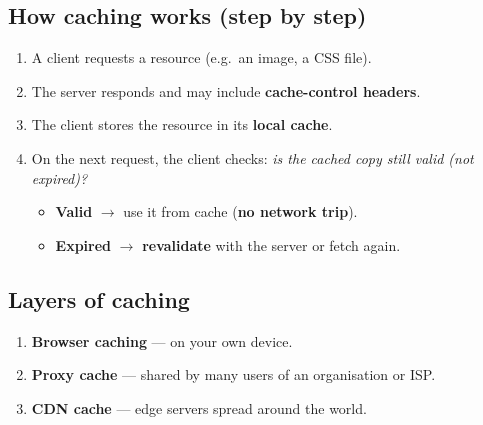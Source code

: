 \subsection{How caching works (step by step)}
\begin{enumerate}
  \item A client requests a resource (e.g.\ an image, a CSS file).
  \item The server responds and may include \textbf{cache-control headers}.
  \item The client stores the resource in its \textbf{local cache}.
  \item On the next request, the client checks: \emph{is the cached copy still valid (not expired)?}
  \begin{itemize}
    \item \textbf{Valid} $\to$ use it from cache (\textbf{no network trip}).
    \item \textbf{Expired} $\to$ \textbf{revalidate} with the server or fetch again.
  \end{itemize}
\end{enumerate}

\subsection{Layers of caching}
\begin{center}
\end{center}
\begin{enumerate}
  \item \textbf{Browser caching} --- on your own device.
  \item \textbf{Proxy cache} --- shared by many users of an organisation or ISP.
  \item \textbf{CDN cache} --- edge servers spread around the world.
\end{enumerate}

